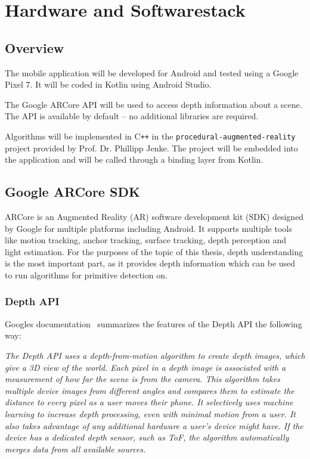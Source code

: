 \chapter{Hardware and Softwarestack}\label{ch:hardware-and-softwarestack}


\section{Overview}\label{sec:overview}

The mobile application will be developed for Android and tested using a Google Pixel 7.
It will be coded in Kotlin using Android Studio.

The Google ARCore API will be used to access depth information about a scene.
The API is available by default -- no additional libraries are required.

Algorithms will be implemented in C\texttt{++} in the \texttt{procedural-augmented-reality} project provided by Prof. Dr. Phillipp Jenke.
The project will be embedded into the application and will be called through a binding layer from Kotlin.


\section{Google ARCore SDK}

ARCore is an Augmented Reality (AR) software development kit (SDK) designed by Google for multiple platforms including Android.
It supports multiple tools like motion tracking, anchor tracking, surface tracking, depth perception and light estimation.
\parencite{arcore}
For the purposes of the topic of this thesis, depth understanding is the most important part,
as it provides depth information which can be used to run algorithms for primitive detection on.

\subsection{Depth API}
Googles documentation~\parencite{arcore-doc-depth} summarizes the features of the Depth API the following way:

\textit{
    The Depth API uses a depth-from-motion algorithm to create depth images, which give a 3D view of the world.
    Each pixel in a depth image is associated with a measurement of how far the scene is from the camera.
    This algorithm takes multiple device images from different angles and compares them to estimate the distance to every pixel as a user moves their phone.
    It selectively uses machine learning to increase depth processing, even with minimal motion from a user.
    It also takes advantage of any additional hardware a user’s device might have.
    If the device has a dedicated depth sensor, such as ToF, the algorithm automatically merges data from all available sources.
}

